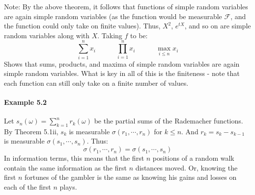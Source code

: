\documentclass[12pt,a4paper]{article}
\newcommand{\1}[1]{\mathbbm{1}\left\{ #1 \right\}}
\newcommand{\fcal}{\mathcal{F}}
\begin{document}
Note: By the above theorem, it follows that functions of simple random variables are again simple random variables (as the function would be measurable $\fcal$, and the function could only take on finite values). Thus, $X^2$, $e^{tX}$, and so on are simple random variables along with $X$. Taking $f$ to be:
$$
	\sum_{i=1}^n x_i \quad\quad\quad
	\prod_{i=1}^n x_i \quad\quad\quad
	\max_{i \leq n} x_i
$$
Shows that sums, products, and maxima of simple random variables are again simple random variables. What is key in all of this is the finiteness - note that each function can still only take on a finite number of values.

\paragraph{Example 5.2} Let $s_n(\omega) = \sum_{k=1}^n r_k(\omega)$ be the partial sums of the Rademacher functions. By Theorem 5.1ii, $s_k$ is measurable $\sigma(r_1, \cdots, r_n)$ for $k \leq n$. And $r_k = s_k - s_{k-1}$ is measurable $\sigma(s_1, \cdots, s_n)$. Thus:
$$
	\sigma(r_1, \cdots, r_n) = \sigma(s_1, \cdots, s_n)
$$
In information terms, this means that the first $n$ positions of a random walk contain the same information as the first $n$ distances moved. Or, knowing the first $n$ fortunes of the gambler is the same as knowing his gains and losses on each of the first $n$ plays.
\end{document}
